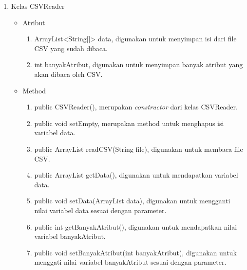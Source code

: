\begin{enumerate}
	\item Kelas CSVReader
	\begin{itemize}
		\item Atribut
		\begin{enumerate}
			\item ArrayList<String[]> data, digunakan untuk menyimpan isi dari file CSV yang sudah dibaca.
			\item int banyakAtribut, digunakan untuk menyimpan banyak atribut yang akan dibaca oleh CSV.
		\end{enumerate}
		\item Method
		\begin{enumerate}
			\item public CSVReader(), merupakan \textsl{constructor} dari kelas CSVReader.
			\item public void setEmpty, merupakan method untuk menghapus isi variabel data.
			\item public ArrayList readCSV(String file), digunakan untuk membaca file CSV.
			\item public ArrayList getData(), digunakan untuk mendapatkan variabel data.
			\item public void setData(ArrayList data), digunakan untuk mengganti nilai variabel data sesuai dengan parameter.
			\item public int getBanyakAtribut(), digunakan untuk mendapatkan nilai variabel banyakAtribut.
			\item public void setBanyakAtribut(int banyakAtribut), digunakan untuk menggati nilai variabel banyakAtribut sesuai dengan parameter.
		\end{enumerate}
	\end{itemize}


\end{enumerate}
